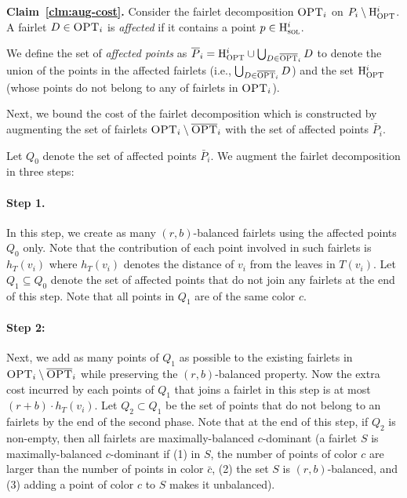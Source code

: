 \begin{proofof}{\bf Claim~\ref{clm:aug-cost}.}
Consider the fairlet decomposition $\textsc{OPT}_i$ on $P_i\setminus \mathrm{H}_{\textsc{OPT}}^i$. A fairlet $D\in \textsc{OPT}_i$ is \emph{affected} if it contains a point $p \in \mathrm{H}_{\textsc{sol}}^i$. 

We define the set of \emph{affected points} as $\overline{P}_i = \mathrm{H}^i_{\textsc{OPT}} \cup \bigcup_{D\in \overline{\textsc{OPT}}_i} D$ to denote the union of the points in the affected fairlets (i.e., $\bigcup_{D\in \overline{\textsc{OPT}}_i} D$) and the set $\mathrm{H}_{\textsc{OPT}}^i$ (whose points do not belong to any of fairlets in $\textsc{OPT}_i$).

Next, we bound the cost of the fairlet decomposition which is constructed by augmenting the set of fairlets $\textsc{OPT}_i \setminus \overline{\textsc{OPT}}_i$ with the set of affected points $\bar{P}_i$. 

Let $Q_0$ denote the set of affected points $\bar{P}_i$. We augment the fairlet decomposition in three steps:

\paragraph{Step 1.} In this step, we create as many $(r,b)$-balanced fairlets using the affected points $Q_0$ only. Note that the contribution of each point involved in such fairlets is $h_T(v_i)$ where $h_T(v_i)$ denotes the distance of $v_i$ from the leaves in $T(v_i)$. Let $Q_1 \subseteq Q_0$ denote the set of affected points that do not join any fairlets at the end of this step. Note that all points in $Q_1$ are of the same color $c$.  
\paragraph{Step 2:} Next, we add as many points of $Q_1$ as possible to the existing fairlets in $\textsc{OPT}_i\setminus \overline{\textsc{OPT}}_i$ while preserving the $(r,b)$-balanced property. Now the extra cost incurred by each points of $Q_1$ that joins a fairlet in this step is at most $(r+b)\cdot h_T(v_i)$. Let $Q_2\subset Q_1$ be the set of points that do not belong to an fairlets by the end of the second phase. Note that at the end of this step, if $Q_2$ is non-empty, then all fairlets are maximally-balanced $c$-dominant (a fairlet $S$ is maximally-balanced $c$-dominant if (1) in $S$, the number of points of color $c$ are larger than the number of points in color $\bar{c}$, (2) the set $S$ is $(r,b)$-balanced, and (3) adding a point of color $c$ to $S$ makes it unbalanced).  

\end{proofof}
